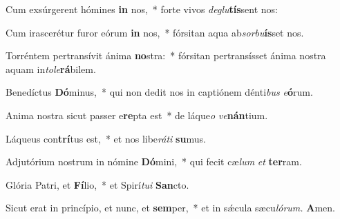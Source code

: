 \item Cum exsúrgerent hómines \textbf{in} nos,~* forte vivos \textit{deglu}\textbf{tís}sent nos:
\item Cum irascerétur furor eórum \textbf{in} nos,~* fórsitan aqua ab\textit{sorbu}\textbf{ís}set nos.
\item Torréntem pertransívit ánima \textbf{no}stra:~* fórsitan pertransísset ánima nostra aquam in\tinyhspace\textit{tole}\textbf{rá}bilem.
\item Benedíctus \textbf{Dó}minus,~* qui non dedit nos in captiónem dénti\textit{bus} \textit{e}\textbf{ó}rum.
\item Anima nostra sicut passer e\textbf{re}pta est~* de láque\tinyhspace\textit{o} \textit{ve}\textbf{nán}tium.
\item Láqueus con\textbf{trí}tus est,~* et nos libe\textit{ráti} \textbf{su}mus.
\item Adjutórium nostrum in nómine \textbf{Dó}mini,~* qui fecit cæ\tinyhspace\textit{lum} \textit{et} \textbf{ter}ram.
\item Glória Patri, et \textbf{Fí}lio,~* et Spirí\tinyhspace\textit{tui} \textbf{San}cto.
\item Sicut erat in princípio, et nunc, et \textbf{sem}per,~* et in sǽcula sæcu\tinyhspace\textit{lórum.} \textbf{A}men.